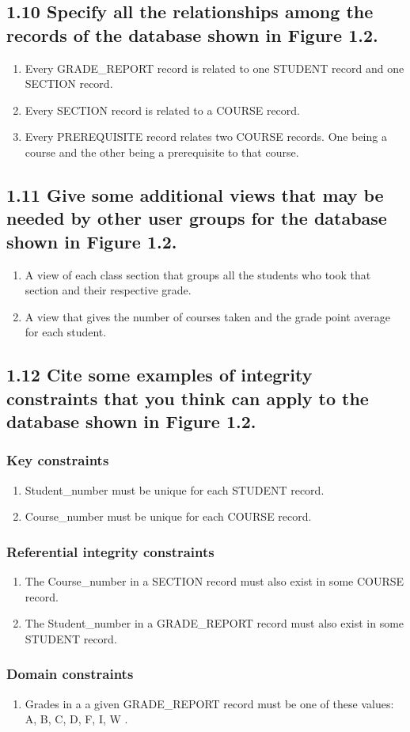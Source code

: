 \subsection*{1.10 Specify all the relationships among the records of the database shown in Figure 1.2.}
\begin{enumerate}
\item Every GRADE\_REPORT record is related to one STUDENT record and one SECTION record.
\item Every SECTION record is related to a COURSE record.
\item Every PREREQUISITE record relates two COURSE records. One being a course and the other being a prerequisite to that course.
\end{enumerate}

\subsection*{1.11 Give some additional views that may be needed by other user groups for the database shown in Figure 1.2.}
\begin{enumerate}
\item A view of each class section that groups all the students who took that section and their respective grade.
\item A view that gives the number of courses taken and the grade point average for each student.
\end{enumerate}

\subsection*{1.12 Cite some examples of integrity constraints that you think can apply to the database shown in Figure 1.2.}
\subsubsection*{Key constraints}
\begin{enumerate}
\item Student\_number must be unique for each STUDENT record.
\item Course\_number must be unique for each COURSE record.
\end{enumerate}

\subsubsection*{Referential integrity constraints}
\begin{enumerate}
\item The Course\_number in a SECTION record must also exist in some COURSE record.
\item The Student\_number in a GRADE\_REPORT record must also exist in some STUDENT record.
\end{enumerate}

\subsubsection*{Domain constraints}
\begin{enumerate}
\item Grades in a a given GRADE\_REPORT record must be one of these values: {A, B, C, D, F, I, W} .
\end{enumerate}